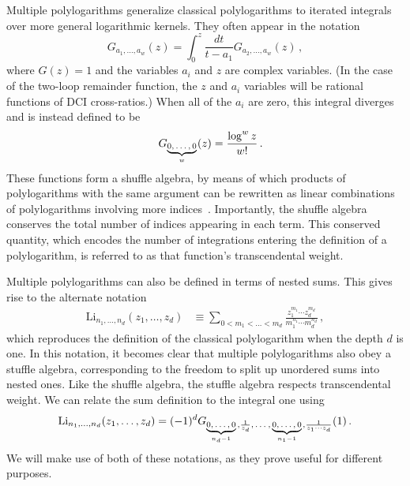 \documentclass[11pt]{article}
\newcommand{\fwboxL}[2]{\text{\makebox[#1][l]{$#2$}}}
\begin{document}



Multiple polylogarithms generalize classical polylogarithms to iterated integrals over more general logarithmic kernels. They often appear in the notation
\begin{equation} \label{eq:G_notation}
G_{a_1,\dots, a_w}(z) = \int_0^z \frac{dt}{t-a_1} G_{a_2,\dots, a_w}(z)\, ,
\end{equation}
where $G(z) = 1$ and the variables $a_i$ and $z$ are complex variables. (In the case of the two-loop remainder function, the $z$ and $a_i$ variables will be rational functions of DCI cross-ratios.) When all of the $a_i$ are zero, this integral diverges and is instead defined to be
\begin{equation}
\quad G_{\fwboxL{27pt}{{\underbrace{0,\dots,0}_{w}}}}(z) = \frac{\log^w z}{w!} \, .
\end{equation}
These functions form a shuffle algebra, by means of which products of polylogarithms with the same argument can be rewritten as linear combinations of polylogarithms involving more indices~\cite{Ree:1958}. Importantly, the shuffle algebra conserves the total number of indices appearing in each term. This conserved quantity, which encodes the number of integrations entering the definition of a polylogarithm, is referred to as that function's transcendental weight. 

Multiple polylogarithms can also be defined in terms of nested sums. This gives rise to the alternate notation
\begin{align} \label{eq:Li_notation}
\text{Li}_{n_1,\dots,n_d}(z_1,\dots, z_d) &\equiv \sum_{0 < m_1 < \dots < m_d} \frac{z_1^{m_1} \cdots z_d^{m_d}}{m_1^{n_1} \cdots m_d^{n_d}} \, ,
\end{align}
which reproduces the definition of the classical polylogarithm when the depth $d$ is one. In this notation, it becomes clear that multiple polylogarithms also obey a stuffle algebra, corresponding to the freedom to split up unordered sums into nested ones. Like the shuffle algebra, the stuffle algebra respects transcendental weight. We can relate the sum definition to the integral one using
\begin{align}
\text{Li}_{n_1,\dots,n_d}(z_1,\dots, z_d) = (-1)^d G_{\fwboxL{28pt}{\underbrace{0,\dots,0}_{n_d-1}},\frac{1}{z_d},\fwboxL{13pt}{\,\dots},\fwboxL{29pt}{\,\underbrace{0,\dots,0}_{n_1-1}},\frac{1}{z_1 \cdots z_d}}(1) \, .
\end{align}
We will make use of both of these notations, as they prove useful for different purposes. 
\end{document}

